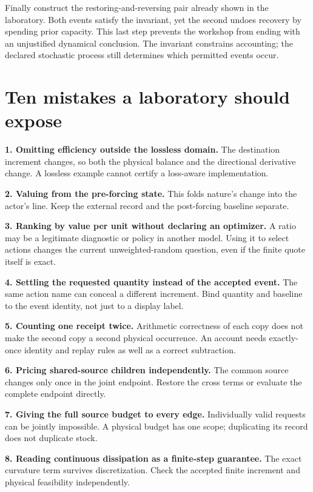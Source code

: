 Finally construct the restoring-and-reversing pair already shown in
the laboratory. Both events satisfy the invariant, yet the second
undoes recovery by spending prior capacity. This last step prevents
the workshop from ending with an unjustified dynamical conclusion.
The invariant constrains accounting; the declared stochastic process
still determines which permitted events occur.

\section{Ten mistakes a laboratory should expose}
\textbf{1. Omitting efficiency outside the lossless domain.}
The destination increment changes, so both the physical balance and
the directional derivative change. A lossless example cannot certify
a loss-aware implementation.

\textbf{2. Valuing from the pre-forcing state.}
This folds nature's change into the actor's line. Keep the external
record and the post-forcing baseline separate.

\textbf{3. Ranking by value per unit without declaring an optimizer.}
A ratio may be a legitimate diagnostic or policy in another model.
Using it to select actions changes the current unweighted-random
question, even if the finite quote itself is exact.

\textbf{4. Settling the requested quantity instead of the accepted event.}
The same action name can conceal a different increment. Bind quantity
and baseline to the event identity, not just to a display label.

\textbf{5. Counting one receipt twice.}
Arithmetic correctness of each copy does not make the second copy a
second physical occurrence. An account needs exactly-once identity and
replay rules as well as a correct subtraction.

\textbf{6. Pricing shared-source children independently.}
The common source changes only once in the joint endpoint. Restore
the cross terms or evaluate the complete endpoint directly.

\textbf{7. Giving the full source budget to every edge.}
Individually valid requests can be jointly impossible. A physical
budget has one scope; duplicating its record does not duplicate stock.

\textbf{8. Reading continuous dissipation as a finite-step guarantee.}
The exact curvature term survives discretization. Check the accepted
finite increment and physical feasibility independently.

